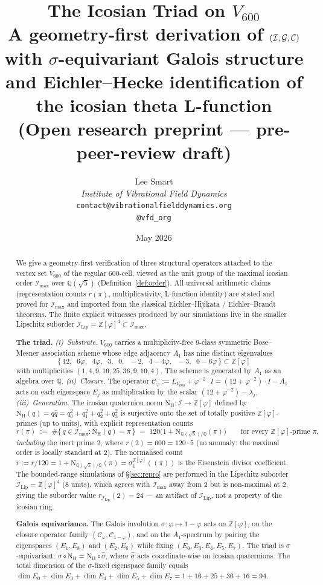 \documentclass[11pt,a4paper]{article}
\title{\textbf{The Icosian Triad on $V_{600}$}\\[2pt]
\large A geometry-first derivation of $(\II, \GG, \CC)$ with $\sigma$-equivariant Galois structure\\[2pt]
\normalsize and Eichler--Hecke identification of the icosian theta L-function\\[6pt]
\small (Open research preprint --- pre-peer-review draft)}
\author{%
  Lee Smart\\[4pt]
  \textit{Institute of Vibrational Field Dynamics}\\[2pt]
  \texttt{contact@vibrationalfielddynamics.org}\\[2pt]
  \texttt{@vfd\_org}%
}
\date{May 2026}
\theoremstyle{definition}
\theoremstyle{remark}
\newcommand{\Z}{\mathbb{Z}}
\newcommand{\Q}{\mathbb{Q}}
\newcommand{\II}{\mathcal{I}}
\newcommand{\IIlip}{\mathcal{I}_{\mathrm{Lip}}}
\newcommand{\IImax}{\mathcal{I}_{\mathrm{max}}}
\newcommand{\CC}{\mathcal{C}}
\newcommand{\NH}{\mathrm{N}_{\mathrm{H}}}
\newcommand{\NQ}{\mathrm{N}_{\mathbb{Q}(\sqrt{5})/\mathbb{Q}}}
\newcommand{\Zphi}{\Z[\varphi]}
\begin{document}
\maketitle
\thispagestyle{empty}

\begin{abstract}
\noindent
We give a geometry-first verification of three structural operators
attached to the vertex set $V_{600}$ of the regular $600$-cell, viewed
as the unit group of the maximal icosian order $\IImax$ over
$\Q(\sqrt{5})$ (Definition~\ref{def:order}). All universal arithmetic
claims (representation counts $r(\pi)$, multiplicativity, L-function
identity) are stated and proved for $\IImax$ and imported from the
classical Eichler--Hijikata / Eichler--Brandt theorems. The finite
explicit witnesses produced by our simulations live in the smaller
Lipschitz suborder $\IIlip = \Zphi^4 \subset \IImax$.

\smallskip\noindent\textbf{The triad.}
\emph{(i)~Substrate.} $V_{600}$ carries a multiplicity-free $9$-class symmetric
Bose--Mesner association scheme whose edge adjacency $A_1$ has nine distinct
eigenvalues
\[
\bigl\{\, 12,\;\; 6\varphi,\;\; 4\varphi,\;\; 3,\;\; 0,\;\; -2,\;\; 4-4\varphi,\;\; -3,\;\; 6-6\varphi \,\bigr\}\subset \Zphi
\]
with multiplicities $(1,4,9,16,25,36,9,16,4)$. The scheme is
generated by $A_1$ as an algebra over $\Q$.
\emph{(ii)~Closure.} The operator $\CC_\varphi := L_{V_{600}} + \varphi^{-2}\!\cdot\! I = (12+\varphi^{-2})\!\cdot\! I - A_1$
acts on each eigenspace $E_j$ as multiplication by the scalar $(12+\varphi^{-2}) - \lambda_j$.
\emph{(iii)~Generation.} The icosian quaternion norm
$\NH : \II \to \Zphi$ defined by $\NH(q) = q\bar q = q_0^2 + q_1^2 + q_2^2 + q_3^2$
is surjective onto the set of totally positive $\Zphi$-primes (up to units),
with explicit representation counts
\[
  r(\pi) \;:=\; \#\{\, q \in \IImax : \NH(q) = \pi\,\} \;=\; 120\bigl(1 + \NQ(\pi)\bigr)
  \qquad \text{for every }\Zphi\text{-prime }\pi,
\]
\emph{including} the inert prime $2$, where $r(2) = 600 = 120\cdot 5$ (no
anomaly: the maximal order is locally standard at $2$). The normalised count
$\widetilde r := r/120 = 1 + \NQ(\pi) = \sigma_1^{\Zphi}((\pi))$ is the
Eisenstein divisor coefficient. The bounded-range simulations of
\S\ref{sec:repro} are performed in the Lipschitz suborder
$\IIlip = \Zphi^4$ ($8$ units), which agrees with $\IImax$ away from $2$ but
is non-maximal at $2$, giving the suborder value $r_{\IIlip}(2)=24$ --- an
artifact of $\IIlip$, not a property of the icosian ring.

\smallskip\noindent\textbf{Galois equivariance.}
The Galois involution $\sigma : \varphi \mapsto 1-\varphi$ acts on $\Zphi$, on
the closure operator family $(\CC_\varphi, \CC_{1-\varphi})$, and on the
$A_1$-spectrum by pairing the eigenspaces $(E_1, E_8)$ and $(E_2, E_6)$ while
fixing $(E_0, E_3, E_4, E_5, E_7)$. The triad is $\sigma$-equivariant:
$\sigma \circ \NH = \NH \circ \widehat{\sigma}$, where $\widehat{\sigma}$ acts
coordinate-wise on icosian quaternions. The total dimension of the
$\sigma$-fixed eigenspace family equals
$\dim E_0 + \dim E_3 + \dim E_4 + \dim E_5 + \dim E_7 = 1+16+25+36+16 = 94$.


\end{abstract}
\end{document}
